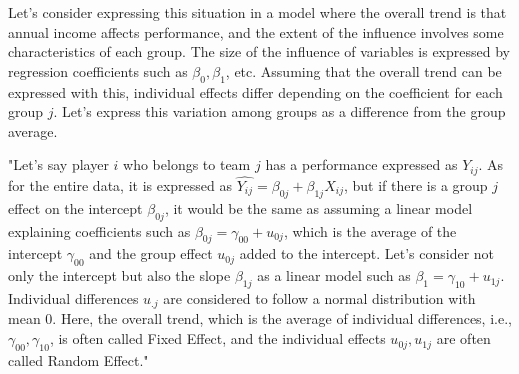 \documentclass{ltjsbook}
\begin{document}
Let's consider expressing this situation in a model where the overall trend is that annual income affects performance, and the extent of the influence involves some characteristics of each group.
The size of the influence of variables is expressed by regression coefficients such as $\beta_0, \beta_1$, etc. Assuming that the overall trend can be expressed with this, individual effects differ depending on the coefficient for each group $j$. Let's express this variation among groups as a difference from the group average.

"Let's say player $i$ who belongs to team $j$ has a performance expressed as $Y_{ij}$. As for the entire data, it is expressed as $\hat{Y_{ij}} = \beta_{0j} + \beta_{1j} X_{ij}$, but if there is a group $j$ effect on the intercept $\beta_{0j}$, it would be the same as assuming a linear model explaining coefficients such as $\beta_{0j} = \gamma_{00} + u_{0j}$, which is the average of the intercept $\gamma_{00}$ and the group effect $u_{0j}$ added to the intercept. Let's consider not only the intercept but also the slope $\beta_{1j}$ as a linear model such as $\beta_{1} = \gamma_{10} + u_{1j}$. Individual differences $u_{.j}$ are considered to follow a normal distribution with mean $0$. Here, the overall trend, which is the average of individual differences, i.e., $\gamma_{00},\gamma_{10}$, is often called Fixed Effect, and the individual effects $u_{0j},u_{1j}$ are often called Random Effect."
\end{document}
